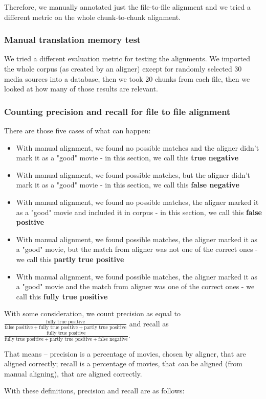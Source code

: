 Therefore, we manually annotated just the file-to-file alignment and we tried a different metric on the whole chunk-to-chunk alignment.

\subsubsection{Manual translation memory test}
We tried a different evaluation metric for testing the alignments. We imported the whole corpus (as created by an aligner) except for randomly selected 30 media sources into a database, then we took 20 chunks from each file, then we looked at how many of those results are relevant.

\subsubsection{Counting precision and recall for file to file alignment}
There are those five cases of what can happen:
\begin{itemize}
    \item With manual alignment, we found no possible matches and the aligner didn't mark it as a "good" movie - in this section, we call this \textbf{true negative}
    \item With manual alignment, we found possible matches, but the aligner didn't mark it as a "good" movie - in this section, we call this \textbf{false negative}
    \item With manual alignment, we found no possible matches, the aligner marked it as a "good" movie and included it in corpus - in this section, we call this \textbf{false positive}
    \item With manual alignment, we found possible matches, the aligner marked it as a "good" movie, but the match from aligner was not one of the correct ones -  we call this \textbf{partly true positive}
    \item  With manual alignment, we found possible matches, the aligner marked it as a "good" movie and the match from aligner was  one of the correct ones -  we call this \textbf{fully true positive}
\end{itemize}

With some consideration, we count precision as equal to $\frac{\text{fully true positive}}{\text{false positive}+\text{fully true positive}+\text{partly true positive}}$ and recall as $\frac{\text{fully true positive}}{\text{fully true positive}+\text{partly true positive}+\text{false negative}}$.

That means -- precision is a percentage of movies, chosen by aligner, that are aligned correctly; recall is a percentage of movies, that \emph{can} be aligned (from manual aligning), that are aligned correctly.

With these definitions, precision and recall are as follows: